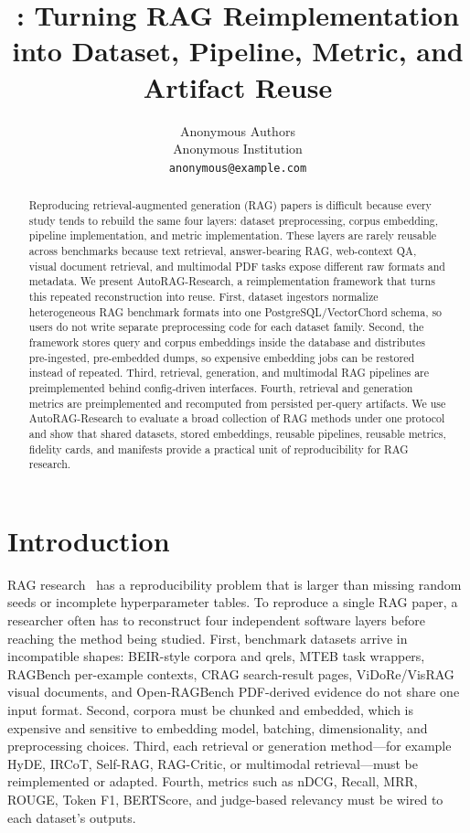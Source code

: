 \documentclass{article}
\title{\framework{}: Turning RAG Reimplementation into Dataset, Pipeline, Metric, and Artifact Reuse}
\author{%
  Anonymous Authors\\
  Anonymous Institution\\
  \texttt{anonymous@example.com}
}
\newcommand{\framework}{AutoRAG-Research}
\begin{document}
\raggedbottom

\maketitle


\begin{abstract}
Reproducing retrieval-augmented generation (RAG) papers is difficult because every study tends to rebuild the same four layers: dataset preprocessing, corpus embedding, pipeline implementation, and metric implementation. These layers are rarely reusable across benchmarks because text retrieval, answer-bearing RAG, web-context QA, visual document retrieval, and multimodal PDF tasks expose different raw formats and metadata. We present \framework{}, a reimplementation framework that turns this repeated reconstruction into reuse. First, dataset ingestors normalize heterogeneous RAG benchmark formats into one PostgreSQL/VectorChord schema, so users do not write separate preprocessing code for each dataset family. Second, the framework stores query and corpus embeddings inside the database and distributes pre-ingested, pre-embedded dumps, so expensive embedding jobs can be restored instead of repeated. Third, retrieval, generation, and multimodal RAG pipelines are preimplemented behind config-driven interfaces. Fourth, retrieval and generation metrics are preimplemented and recomputed from persisted per-query artifacts. We use \framework{} to evaluate a broad collection of RAG methods under one protocol and show that shared datasets, stored embeddings, reusable pipelines, reusable metrics, fidelity cards, and manifests provide a practical unit of reproducibility for RAG research.
\end{abstract}

\section{Introduction}

RAG research~\citep{lewis2020rag} has a reproducibility problem that is larger than missing random seeds or incomplete hyperparameter tables. To reproduce a single RAG paper, a researcher often has to reconstruct four independent software layers before reaching the method being studied. First, benchmark datasets arrive in incompatible shapes: BEIR-style corpora and qrels, MTEB task wrappers, RAGBench per-example contexts, CRAG search-result pages, ViDoRe/VisRAG visual documents, and Open-RAGBench PDF-derived evidence do not share one input format. Second, corpora must be chunked and embedded, which is expensive and sensitive to embedding model, batching, dimensionality, and preprocessing choices. Third, each retrieval or generation method---for example HyDE, IRCoT, Self-RAG, RAG-Critic, or multimodal retrieval---must be reimplemented or adapted. Fourth, metrics such as nDCG, Recall, MRR, ROUGE, Token F1, BERTScore, and judge-based relevancy must be wired to each dataset's outputs.
\end{document}
